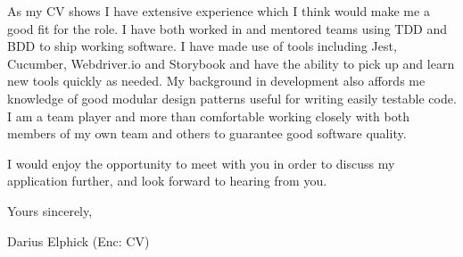 \documentclass[11pt,letterpaper]{article}
\begin{document}
As my CV shows I have extensive experience which I think would make me a good fit for the role. I have both worked in and mentored teams using TDD and BDD to ship working software. I have made use of tools including Jest, Cucumber, Webdriver.io and Storybook and have the ability to pick up and learn new tools quickly as needed. My background in development also affords me knowledge of good modular design patterns useful for writing easily testable code. I am a team player and more than comfortable working closely with both members of my own team and others to guarantee good software quality.  

I would enjoy the opportunity to meet with you in order to discuss my application further, and look forward to hearing from you.

Yours sincerely, 
\begin{figure}[h]
	\vspace{-10pt}
	\vspace{-20pt}
\end{figure}

Darius Elphick\newline
(Enc: CV) 
\end{document}
